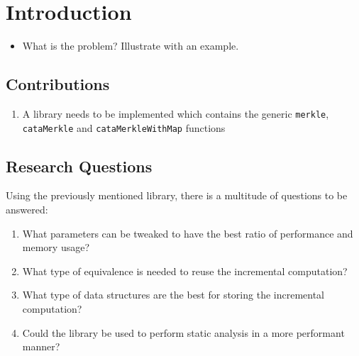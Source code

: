 \section{Introduction}
\begin{itemize}
    \item What is the problem? Illustrate with an example.
\end{itemize}


\subsection{Contributions}
\begin{enumerate}[label={(\Alph*)}]
    \item A library needs to be implemented which contains the generic \texttt{merkle}, \texttt{cataMerkle} and \texttt{cataMerkleWithMap} functions
\end{enumerate}

\subsection{Research Questions}
Using the previously mentioned library, there is a multitude of questions to be answered:
\begin{enumerate}[label={(\Alph*)}]
    \item What parameters can be tweaked to have the best ratio of performance and memory usage?
    \item What type of equivalence is needed to reuse the incremental computation?
    \item What type of data structures are the best for storing the incremental computation?
    \item Could the library be used to perform static analysis in a more performant manner?
\end{enumerate}